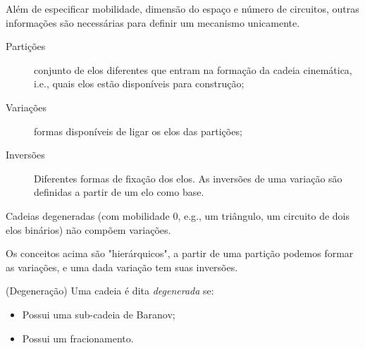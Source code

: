 
Além de especificar mobilidade, dimensão do espaço e número de circuitos, outras informações são necessárias para definir um mecanismo unicamente.

\begin{description}
    \item[Partições] conjunto de elos diferentes que entram na formação da cadeia cinemática, i.e., quais elos estão disponíveis para construção;
    \item[Variações] formas disponíveis de ligar os elos das partições;
    \item[Inversões] Diferentes formas de fixação dos elos. As inversões de uma variação são definidas a partir de um elo como base.
\end{description}

\begin{note}
    Cadeias degeneradas (com mobilidade 0, e.g., um triângulo, um circuito de dois elos binários) não compõem variações.
\end{note}

\begin{note}
    Os conceitos acima são "hierárquicos", a partir de uma partição podemos formar as variações, e uma dada variação tem suas inversões.
\end{note}

\begin{definition}
    (Degeneração) Uma cadeia é dita \emph{degenerada} se:
    \begin{itemize}
        \item Possui uma sub-cadeia de Baranov;
	\item Possui um fracionamento.
    \end{itemize}
\end{definition}

